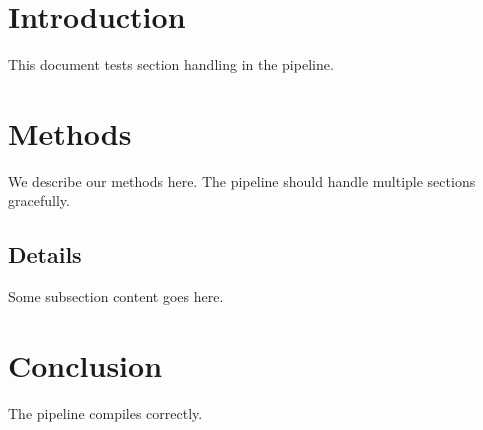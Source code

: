 \documentclass{article}
\begin{document}
\section{Introduction}
This document tests section handling in the pipeline.

\section{Methods}
We describe our methods here.
The pipeline should handle multiple sections gracefully.

\subsection{Details}
Some subsection content goes here.

\section{Conclusion}
The pipeline compiles correctly.
\end{document}
